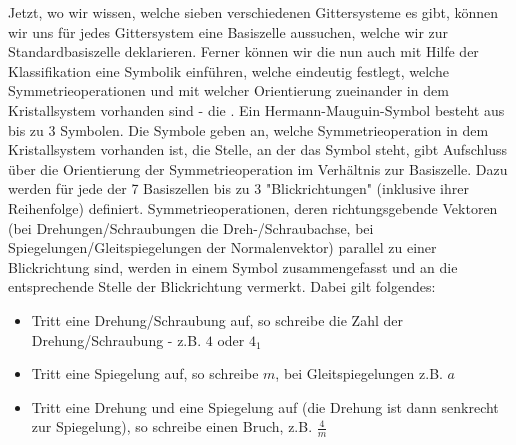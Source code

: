 Jetzt, wo wir wissen, welche sieben verschiedenen Gittersysteme es gibt, können wir uns für jedes Gittersystem eine Basiszelle aussuchen, welche wir zur Standardbasiszelle deklarieren. Ferner können wir die nun auch mit Hilfe der Klassifikation eine Symbolik einführen, welche eindeutig festlegt, welche Symmetrieoperationen und mit welcher Orientierung zueinander in dem Kristallsystem vorhanden sind - die . Ein Hermann-Mauguin-Symbol besteht aus bis zu 3 Symbolen. Die Symbole geben an, welche Symmetrieoperation in dem Kristallsystem vorhanden ist, die Stelle, an der das Symbol steht, gibt Aufschluss über die Orientierung der Symmetrieoperation im Verhältnis zur Basiszelle. Dazu werden für jede der 7 Basiszellen bis zu 3 "Blickrichtungen" (inklusive ihrer Reihenfolge) definiert. Symmetrieoperationen, deren richtungsgebende Vektoren (bei Drehungen/Schraubungen die Dreh-/Schraubachse, bei Spiegelungen/Gleitspiegelungen der Normalenvektor) parallel zu einer  Blickrichtung sind, werden in einem Symbol zusammengefasst und an die entsprechende Stelle der Blickrichtung vermerkt. Dabei gilt folgendes:
\begin{itemize}
	\item Tritt eine Drehung/Schraubung auf, so schreibe die Zahl der Drehung/Schraubung - z.B. $4$ oder $4_1$
	\item Tritt eine Spiegelung auf, so schreibe $m$, bei Gleitspiegelungen z.B. $a$
	\item Tritt eine Drehung und eine Spiegelung auf (die Drehung ist dann senkrecht zur Spiegelung), so schreibe einen Bruch, z.B. $\frac{4}{m}$
\end{itemize}

